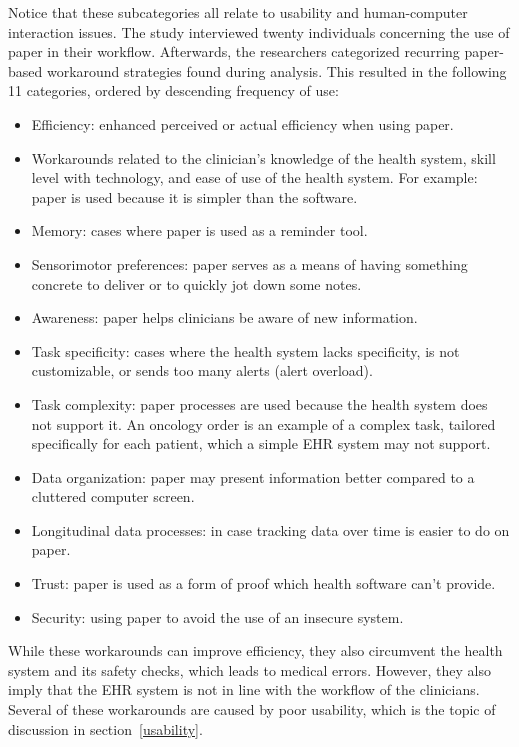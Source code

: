     \noindent Notice that these subcategories all  relate to usability and human-computer interaction issues. The study interviewed twenty individuals concerning the use of paper in their workflow. Afterwards, the researchers categorized recurring paper-based workaround strategies found during analysis. This resulted in the following 11 categories, ordered by descending frequency of use:
    \begin{itemize}
        \item Efficiency: enhanced perceived or actual efficiency when using paper.
        \item Workarounds related to the clinician's knowledge of the health system, skill level with technology, and ease of use of the health system. For example: paper is used because it is simpler than the software.
        \item Memory: cases where paper is used as a reminder tool.
        \item Sensorimotor preferences: paper serves as a means of having something concrete to deliver or to quickly jot down some notes.
        \item Awareness: paper helps clinicians be aware of new information.
        \item Task specificity: cases where the health system lacks specificity, is not customizable, or sends too many alerts (alert overload).
        \item Task complexity: paper processes are used because the health system does not support it. An oncology order is an example of a complex task, tailored specifically for each patient, which a simple EHR system may not support.
        \item Data organization: paper may present information better compared to a cluttered computer screen.
        \item Longitudinal data processes: in case tracking data over time is easier to do on paper.
        \item Trust: paper is used as a form of proof which health software can't provide.
        \item Security: using paper to avoid the use of an insecure system.
    \end{itemize}

    \noindent While these workarounds can improve efficiency, they also circumvent the health system and its safety checks, which leads to medical errors. However, they also imply that the EHR system is not in line with the workflow of the clinicians. Several of these workarounds are caused by poor usability, which is the topic of discussion in section~\ref{usability}.

